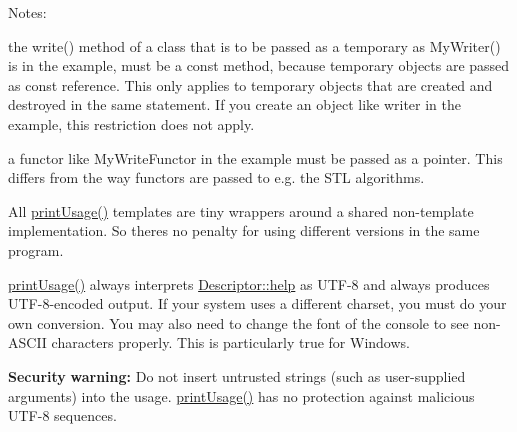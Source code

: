 \begin{DoxyParagraph}{Notes\+:}
\begin{DoxyItemize}
\item the {\ttfamily write()} method of a class that is to be passed as a temporary as {\ttfamily My\+Writer()} is in the example, must be a {\ttfamily const} method, because temporary objects are passed as const reference. This only applies to temporary objects that are created and destroyed in the same statement. If you create an object like {\ttfamily writer} in the example, this restriction does not apply. \item a functor like {\ttfamily My\+Write\+Functor} in the example must be passed as a pointer. This differs from the way functors are passed to e.\+g. the S\+TL algorithms. \item All \hyperlink{namespaceoption_afc8bb7e040a98a0b33ff1ce9da1be0d1}{print\+Usage()} templates are tiny wrappers around a shared non-\/template implementation. So there\textquotesingle{}s no penalty for using different versions in the same program. \item \hyperlink{namespaceoption_afc8bb7e040a98a0b33ff1ce9da1be0d1}{print\+Usage()} always interprets \hyperlink{structoption_1_1_descriptor_a9045b19311533e1b8a08645d57149c79}{Descriptor\+::help} as U\+T\+F-\/8 and always produces U\+T\+F-\/8-\/encoded output. If your system uses a different charset, you must do your own conversion. You may also need to change the font of the console to see non-\/\+A\+S\+C\+II characters properly. This is particularly true for Windows. \item {\bfseries Security} {\bfseries warning\+:} Do not insert untrusted strings (such as user-\/supplied arguments) into the usage. \hyperlink{namespaceoption_afc8bb7e040a98a0b33ff1ce9da1be0d1}{print\+Usage()} has no protection against malicious U\+T\+F-\/8 sequences.\end{DoxyItemize}

\end{DoxyParagraph}

